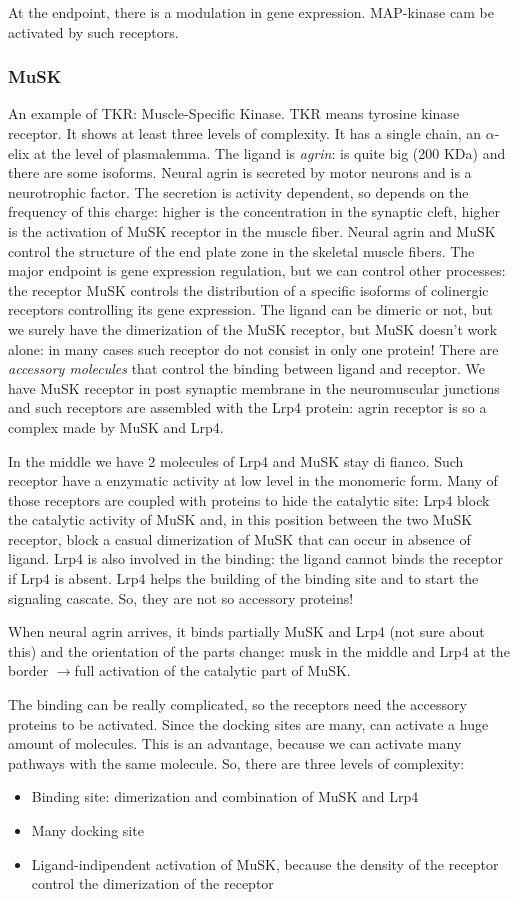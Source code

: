 \documentclass[a4paper, 12pt]{book}
\newcommand{\lfreccia}{\ensuremath{\longrightarrow}}
\begin{document}
At the endpoint, there is a modulation in gene expression. MAP-kinase cam be activated by such receptors.
\subsubsection{MuSK}
An example of TKR: Muscle-Specific Kinase. TKR means tyrosine kinase receptor.
It shows at least three levels of complexity. It has a single chain, an $\alpha$-elix at the level of plasmalemma. The ligand is \emph{agrin}: is quite big (200 KDa) and there are some isoforms. Neural agrin is secreted by motor neurons and is a neurotrophic factor. The secretion is activity dependent, so depends on the frequency of this charge: higher is the concentration in the synaptic cleft, higher is the activation of MuSK receptor in the muscle fiber. Neural agrin and MuSK control the structure of the end plate zone in the skeletal muscle fibers. The major endpoint is gene expression regulation, but we can control other processes: the receptor MuSK controls the distribution of a specific isoforms of colinergic receptors controlling its gene expression. The ligand can be dimeric or not, but we surely have the dimerization of the MuSK receptor, but MuSK doesn't work alone: in many cases such receptor do not consist in only one protein!  There are \emph{accessory molecules} that control the binding between ligand and receptor. We have MuSK receptor in post synaptic membrane in the neuromuscular junctions and such receptors are assembled with the Lrp4 protein: agrin  receptor is so a complex made by MuSK and Lrp4.

In the middle we have 2 molecules of Lrp4 and MuSK stay di fianco. Such receptor have a enzymatic activity at low level in the monomeric form. Many of those receptors are coupled with proteins to hide the catalytic site: Lrp4 block the catalytic activity of MuSK and, in this position between the two MuSK receptor, block a casual dimerization of MuSK that can occur in absence of ligand. Lrp4 is also involved in the binding: the ligand cannot binds the receptor if Lrp4 is absent. Lrp4 helps the building of the binding site and to start the signaling cascate. So, they are not so accessory proteins! 

When neural agrin arrives, it binds partially MuSK and Lrp4 (not sure about this) and the orientation of the parts change: musk in the middle and Lrp4 at the border \lfreccia full activation of the catalytic part of MuSK.


The binding can  be really complicated, so the receptors need the accessory proteins to be activated. Since the docking sites are many, can activate a huge amount of molecules. This is an advantage, because we can activate many pathways with the same molecule.
So, there are three levels of complexity:
\begin{itemize}
\item{Binding site: dimerization and combination of MuSK and Lrp4}
\item{Many docking site}
\item{Ligand-indipendent activation of MuSK, because the density of the receptor control the dimerization of the receptor}
\end{itemize}
\end{document}
